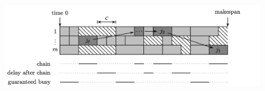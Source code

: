 	\begin{figure}
	\begin{center}
            \includegraphics[width=15cm]{chapters/scheduling1/graham_analysis}

\end{center}
\end{figure}
